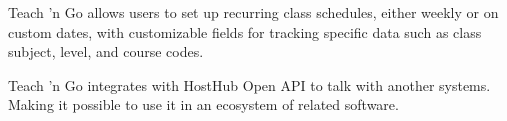 Teach 'n Go allows users to set up recurring class schedules, either weekly or on custom dates, with customizable fields for tracking specific data such as class subject, level, and course codes.

Teach 'n Go integrates with HostHub Open API to talk with another systems. Making it possible to use it in an ecosystem of related software.


%
